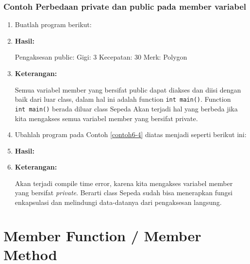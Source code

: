 \subsubsection*{Contoh Perbedaan private dan public pada member variabel}
\begin{enumerate}


	\item Buatlah program berikut:



\item \textbf{Hasil:}

	\begin{lcverbatim}
Pengaksesan public:
Gigi: 3
Kecepatan: 30
Merk: Polygon
	\end{lcverbatim}

\item \textbf{Keterangan:}

	Semua variabel member yang bersifat public dapat diakses dan diisi
	dengan baik dari luar class, dalam hal ini adalah function
	\texttt{int\ main()}. Function \texttt{int\ main()} berada diluar class
	Sepeda Akan terjadi hal yang berbeda jika kita mengakses semua variabel
	member yang bersifat private.

\item Ubahlah program pada Contoh \ref{contoh6-4} diatas menjadi seperti berikut ini:



\item \textbf{Hasil:}

	\begin{figure}[htbp]
 \centering
{}

	\end{figure}

\item \textbf{Keterangan:}

	Akan terjadi compile time error, karena kita mengakses variabel member
	yang bersifat \emph{private}. Berarti class Sepeda sudah bisa menerapkan
	fungsi enkapsulasi dan melindungi data-datanya dari pengaksesan
	langsung.
\end{enumerate}




\section{Member Function / Member
Method}\label{member-function-member-method}

